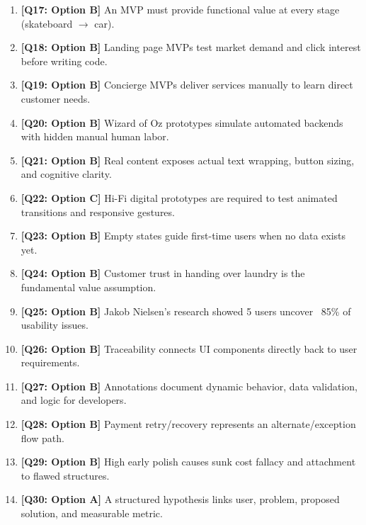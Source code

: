 \begin{expbox}
\begin{enumerate}[leftmargin=6mm, itemsep=2.5mm]
  \item \textbf{[Q17: Option B]} An MVP must provide functional value at every stage (skateboard $\rightarrow$ car).
  \item \textbf{[Q18: Option B]} Landing page MVPs test market demand and click interest before writing code.
  \item \textbf{[Q19: Option B]} Concierge MVPs deliver services manually to learn direct customer needs.
  \item \textbf{[Q20: Option B]} Wizard of Oz prototypes simulate automated backends with hidden manual human labor.
  \item \textbf{[Q21: Option B]} Real content exposes actual text wrapping, button sizing, and cognitive clarity.
  \item \textbf{[Q22: Option C]} Hi-Fi digital prototypes are required to test animated transitions and responsive gestures.
  \item \textbf{[Q23: Option B]} Empty states guide first-time users when no data exists yet.
  \item \textbf{[Q24: Option B]} Customer trust in handing over laundry is the fundamental value assumption.
  \item \textbf{[Q25: Option B]} Jakob Nielsen's research showed 5 users uncover ~85\% of usability issues.
  \item \textbf{[Q26: Option B]} Traceability connects UI components directly back to user requirements.
  \item \textbf{[Q27: Option B]} Annotations document dynamic behavior, data validation, and logic for developers.
  \item \textbf{[Q28: Option B]} Payment retry/recovery represents an alternate/exception flow path.
  \item \textbf{[Q29: Option B]} High early polish causes sunk cost fallacy and attachment to flawed structures.
  \item \textbf{[Q30: Option A]} A structured hypothesis links user, problem, proposed solution, and measurable metric.
\end{enumerate}
\end{expbox}
